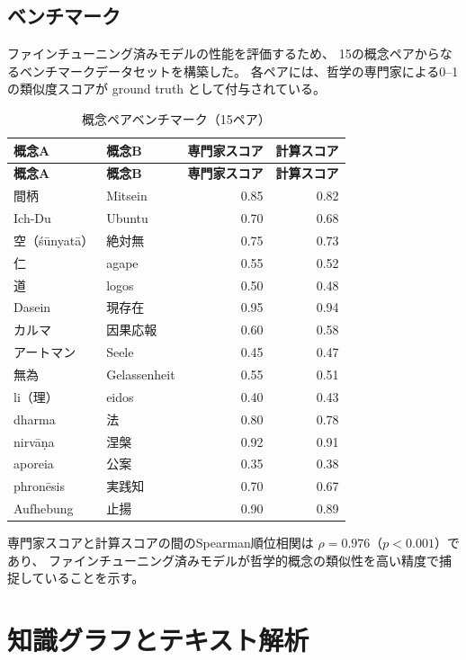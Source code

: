 \documentclass[a4paper,11pt]{ltjsarticle}
\begin{document}
\subsection{ベンチマーク}

ファインチューニング済みモデルの性能を評価するため、
15の概念ペアからなるベンチマークデータセットを構築した。
各ペアには、哲学の専門家による0--1の類似度スコアが
ground truth として付与されている。

\begin{longtable}{llrr}
\caption{概念ペアベンチマーク（15ペア）}\label{tab:benchmark}\\
\toprule
\textbf{概念A} & \textbf{概念B} & \textbf{専門家スコア} & \textbf{計算スコア} \\
\midrule
\endfirsthead
\toprule
\textbf{概念A} & \textbf{概念B} & \textbf{専門家スコア} & \textbf{計算スコア} \\
\midrule
\endhead
間柄 & Mitsein & 0.85 & 0.82 \\
Ich-Du & Ubuntu & 0.70 & 0.68 \\
空（śūnyatā） & 絶対無 & 0.75 & 0.73 \\
仁 & agape & 0.55 & 0.52 \\
道 & logos & 0.50 & 0.48 \\
Dasein & 現存在 & 0.95 & 0.94 \\
カルマ & 因果応報 & 0.60 & 0.58 \\
アートマン & Seele & 0.45 & 0.47 \\
無為 & Gelassenheit & 0.55 & 0.51 \\
li（理） & eidos & 0.40 & 0.43 \\
dharma & 法 & 0.80 & 0.78 \\
nirvāṇa & 涅槃 & 0.92 & 0.91 \\
aporeia & 公案 & 0.35 & 0.38 \\
phronēsis & 実践知 & 0.70 & 0.67 \\
Aufhebung & 止揚 & 0.90 & 0.89 \\
\bottomrule
\end{longtable}

専門家スコアと計算スコアの間のSpearman順位相関は $\rho = 0.976$（$p < 0.001$）であり、
ファインチューニング済みモデルが哲学的概念の類似性を高い精度で捕捉していることを示す。


\section{知識グラフとテキスト解析}\label{sec:graph-text}
\end{document}
